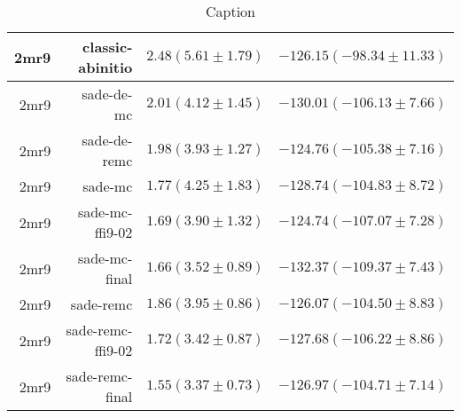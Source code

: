 \begin{table}
\begin{tabular}{r|r|c|c}
        \hline
        2mr9 &   classic-abinitio & $2.48 (  5.61 \pm   1.79)$ & $-126.15 (-98.34 \pm  11.33)$ \\ \hline
        2mr9 &         sade-de-mc & $2.01 (  4.12 \pm   1.45)$ & $-130.01 (-106.13 \pm   7.66)$ \\ \hline
        2mr9 &       sade-de-remc & $1.98 (  3.93 \pm   1.27)$ & $-124.76 (-105.38 \pm   7.16)$ \\ \hline
        2mr9 &            sade-mc & $1.77 (  4.25 \pm   1.83)$ & $-128.74 (-104.83 \pm   8.72)$ \\ \hline
        2mr9 &    sade-mc-ffi9-02 & $1.69 (  3.90 \pm   1.32)$ & $-124.74 (-107.07 \pm   7.28)$ \\ \hline
        2mr9 &      sade-mc-final & $1.66 (  3.52 \pm   0.89)$ & $-132.37 (-109.37 \pm   7.43)$ \\ \hline
        2mr9 &          sade-remc & $1.86 (  3.95 \pm   0.86)$ & $-126.07 (-104.50 \pm   8.83)$ \\ \hline
        2mr9 &  sade-remc-ffi9-02 & $1.72 (  3.42 \pm   0.87)$ & $-127.68 (-106.22 \pm   8.86)$ \\ \hline
        2mr9 &    sade-remc-final & $1.55 (  3.37 \pm   0.73)$ & $-126.97 (-104.71 \pm   7.14)$ \\ \hline
    \end{tabular}
    \caption{Caption}
    \label{label}
\end{table}